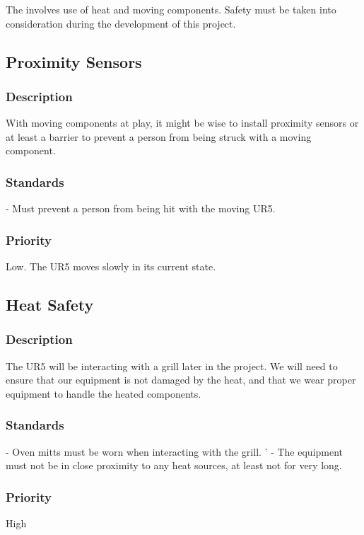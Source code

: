 The \productname{} involves use of heat and moving components. Safety must be taken into consideration during the development of this project.

\subsection{Proximity Sensors}
\subsubsection{Description}
With moving components at play, it might be wise to install proximity sensors or at least a barrier to prevent a person from being struck with a moving component.
\subsubsection{Standards}
- Must prevent a person from being hit with the moving UR5.
\subsubsection{Priority}
Low. The UR5 moves slowly in its current state.



\subsection{Heat Safety}
\subsubsection{Description}
The UR5 will be interacting with a grill later in the project. We will need to ensure that our equipment is not damaged by the heat, and that we wear proper equipment to handle the heated components.
\subsubsection{Standards}
- Oven mitts must be worn when interacting with the grill. '
- The equipment must not be in close proximity to any heat sources, at least not for very long. 
\subsubsection{Priority}
High